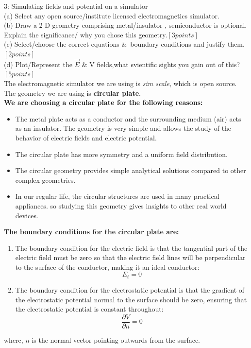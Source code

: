 \documentclass[journal,12pt,onecolumn]{IEEEtran}
\theoremstyle{remark}
\begin{document}
3: Simulating fields and potential on a simulator \\
(a) Select any open source/institute licensed electromagnetics simulator. \\
(b) Draw a 2-D geometry comprising metal/insulator , semiconductor is optional. Explain the significance/ why you chose this geometry.$[3 points]$ \\
(c) Select/choose the correct equations $\&$\ boundary conditions and justify them.$[2 points]$ \\
(d) Plot/Represent the $\overrightarrow{E}$ $\&$ V fields,what svientific sights you gain out of this?$[5 points]$\\

\solution
The electromagnetic simulator we are using is \textit{sim scale}, which is open source.\\
 
The geometry we are using is \textbf{circular plate}.\\

\textbf{We are choosing a circular plate for the following reasons:}

\begin{itemize}
  \item The metal plate acts as a conductor and the surrounding medium (air) acts as an insulator. The geometry is very simple and allows the study of the behavior of electric fields and electric potential.
  \item The circular plate has more symmetry and a uniform field distribution.
  \item The circular geometry provides simple analytical solutions compared to other complex geometries. 
  \item In our regular life, the circular structures are used in many practical appliances. so studying this geometry gives insights to other real world devices.
\end{itemize}

\textbf{The boundary conditions for the circular plate are:}

\begin{enumerate}
  \item The boundary condition for the electric field is that the tangential part of the electric field must be zero so that the electric field lines will be perpendicular to the surface of the conductor, making it an ideal conductor:
  \[ E_t = 0 \]

  \item The boundary condition for the electrostatic potential is that the gradient of the electrostatic potential normal to the surface should be zero, ensuring that the electrostatic potential is constant throughout:
  \[ \frac{\partial V}{\partial n} = 0 \]
\end{enumerate}

where, \( n \) is the normal vector pointing outwards from the surface.
\end{document}
